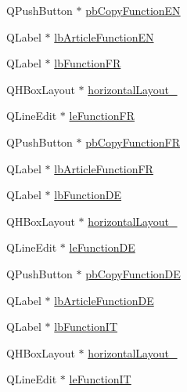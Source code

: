 \begin{DoxyCompactItemize}
\item 
Q\-Push\-Button $\ast$ \hyperlink{class_ui__mdt_cl_unit_connection_dialog_a07be27b792257442fb4d457774660142}{pb\-Copy\-Function\-E\-N}
\item 
Q\-Label $\ast$ \hyperlink{class_ui__mdt_cl_unit_connection_dialog_a7879ed1699720b1d4b80a42e8347cb83}{lb\-Article\-Function\-E\-N}
\item 
Q\-Label $\ast$ \hyperlink{class_ui__mdt_cl_unit_connection_dialog_a3800d11e24e47e5462c9fa6e5e2f7972}{lb\-Function\-F\-R}
\item 
Q\-H\-Box\-Layout $\ast$ \hyperlink{class_ui__mdt_cl_unit_connection_dialog_a1570fc70dedf7422959cd5cb1a6680ba}{horizontal\-Layout\-\_}
\item 
Q\-Line\-Edit $\ast$ \hyperlink{class_ui__mdt_cl_unit_connection_dialog_addb279de949cd36d065256cbae866fdd}{le\-Function\-F\-R}
\item 
Q\-Push\-Button $\ast$ \hyperlink{class_ui__mdt_cl_unit_connection_dialog_afd8c443072d2e813f494a77799c5b800}{pb\-Copy\-Function\-F\-R}
\item 
Q\-Label $\ast$ \hyperlink{class_ui__mdt_cl_unit_connection_dialog_ab92c40913c2ae390f101a91fcf301381}{lb\-Article\-Function\-F\-R}
\item 
Q\-Label $\ast$ \hyperlink{class_ui__mdt_cl_unit_connection_dialog_ac635af197d77508cc73d8135be9be1d8}{lb\-Function\-D\-E}
\item 
Q\-H\-Box\-Layout $\ast$ \hyperlink{class_ui__mdt_cl_unit_connection_dialog_a14997475896e523c5614476ebcad9d37}{horizontal\-Layout\-\_}
\item 
Q\-Line\-Edit $\ast$ \hyperlink{class_ui__mdt_cl_unit_connection_dialog_aeebab0edf9398a481f9c3b0848b21c69}{le\-Function\-D\-E}
\item 
Q\-Push\-Button $\ast$ \hyperlink{class_ui__mdt_cl_unit_connection_dialog_ad0346f823edd1f2df0665ba5e8247e5f}{pb\-Copy\-Function\-D\-E}
\item 
Q\-Label $\ast$ \hyperlink{class_ui__mdt_cl_unit_connection_dialog_a5498c0710b24f86bf8baddf74e4705f6}{lb\-Article\-Function\-D\-E}
\item 
Q\-Label $\ast$ \hyperlink{class_ui__mdt_cl_unit_connection_dialog_a13db5b8fb37f6ac2e83451b4119eb988}{lb\-Function\-I\-T}
\item 
Q\-H\-Box\-Layout $\ast$ \hyperlink{class_ui__mdt_cl_unit_connection_dialog_a2af5cc7a5cfe6c8bde1dcc9902276e2a}{horizontal\-Layout\-\_}
\item 
Q\-Line\-Edit $\ast$ \hyperlink{class_ui__mdt_cl_unit_connection_dialog_a08b5e75498912c05295edcd6679bf56f}{le\-Function\-I\-T}

\end{DoxyCompactItemize}
